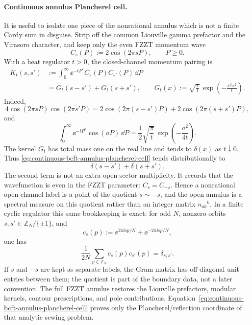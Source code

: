 \paragraph{Continuous annulus Plancherel cell.}
It is useful to isolate one piece of the nonrational annulus which is not a
finite Cardy sum in disguise.  Strip off the common Liouville gamma
prefactor and the Virasoro character, and keep only the even FZZT momentum
wave
\[
  C_s(P):=2\cos(2\pi sP),\qquad P\ge0 .
\]
With a heat regulator \(t>0\), the closed-channel momentum pairing is
\begin{equation}
\begin{aligned}
  K_t(s,s')
  &:=
  \int_0^\infty
  \ee^{-tP^2}C_s(P)C_{s'}(P)\,\dd P
  \\
  &=
  G_t(s-s')+G_t(s+s'),
  \qquad
  G_t(x):=\sqrt{\frac{\pi}{t}}\,
  \exp\!\left(-\frac{\pi^2x^2}{t}\right).
\end{aligned}
  \label{eq:continuous-bcft-annulus-plancherel-cell}
\end{equation}
Indeed,
\[
  4\cos(2\pi sP)\cos(2\pi s'P)
  =
  2\cos(2\pi(s-s')P)+2\cos(2\pi(s+s')P),
\]
and
\[
  \int_0^\infty\ee^{-tP^2}\cos(aP)\,\dd P
  =
  \frac12\sqrt{\frac{\pi}{t}}\,
  \exp\!\left(-\frac{a^2}{4t}\right).
\]
The kernel \(G_t\) has total mass one on the real line and tends to
\(\delta(x)\) as \(t\downarrow0\).  Thus
\eqref{eq:continuous-bcft-annulus-plancherel-cell} tends distributionally to
\[
  \delta(s-s')+\delta(s+s') .
\]
The second term is not an extra open-sector multiplicity.  It records that
the wavefunction is even in the FZZT parameter: \(C_s=C_{-s}\).  Hence a
nonrational open-channel label is a point of the quotient \(s\sim -s\), and
the open annulus is a spectral measure on this quotient rather than an
integer matrix \(n_{ab}{}^k\).  In a finite cyclic regulator this same
bookkeeping is exact: for odd \(N\), nonzero orbits \(s,s'\in
\mathbb Z_N/\{\pm1\}\), and
\[
  c_s(p):=\ee^{2\pi\ii sp/N}+\ee^{-2\pi\ii sp/N},
\]
one has
\begin{equation}
  \frac1{2N}\sum_{p\in\mathbb Z_N}c_s(p)c_{s'}(p)=\delta_{s,s'} .
  \label{eq:finite-cosine-plancherel-regulator}
\end{equation}
If \(s\) and \(-s\) are kept as separate labels, the Gram matrix has
off-diagonal unit entries between them; the quotient is part of the boundary
data, not a later convention.  The full FZZT annulus restores the Liouville
prefactors, modular kernels, contour prescriptions, and pole contributions.
Equation~\eqref{eq:continuous-bcft-annulus-plancherel-cell} proves only the
Plancherel/reflection coordinate of that analytic sewing problem.

